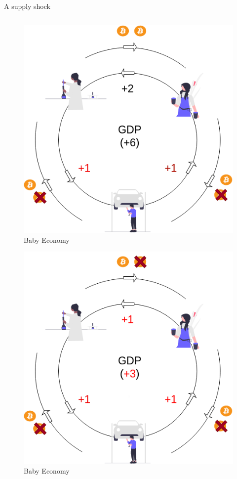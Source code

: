 \begin{frame}{A supply shock}
\begin{columns}[T]
\begin{column}{0.48\textwidth}
\begin{overprint}

\begin{figure}
\centering
\includegraphics[width=1\textwidth,height=\textheight]{assets/circular_supply_3.png}
\caption{Baby Economy}
\end{figure}


\begin{figure}
\centering
\includegraphics[width=1\textwidth,height=\textheight]{assets/circular_supply_4.png}
\caption{Baby Economy}
\end{figure}


\end{overprint}
\end{column}
\end{columns}
\end{frame}
